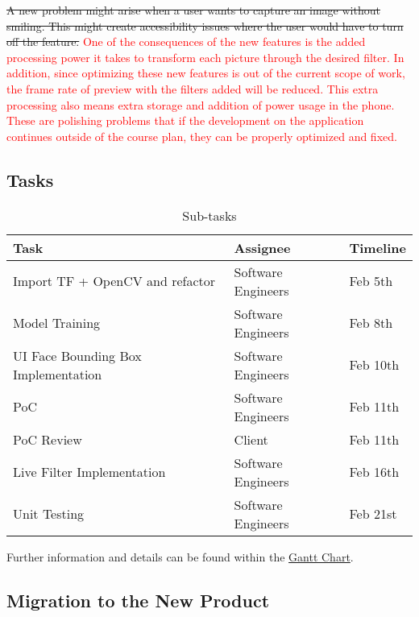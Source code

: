\documentclass[12pt, titlepage]{article}
\begin{document}
\sout{A new problem might arise when a user wants to capture an image without smiling. This might create accessibility issues where the user would have to turn off the feature.} \textcolor{red}{One of the consequences of the new features is the added processing power it takes to transform each picture through the desired filter.  In addition, since optimizing these new features is out of the current scope of work, the frame rate of preview with the filters added will be reduced. This extra processing also means extra storage and addition of power usage in the phone. These are polishing problems that if the development on the application continues outside of the course plan, they can be properly optimized and fixed.  }

\subsection{Tasks}


\begin{table}[h!]
\begin{center}
\begin{tabular}{|l|l|l|}
\hline
Task & Assignee & Timeline  \\\hline
Import TF + OpenCV and refactor & Software Engineers &   Feb 5th  \\\hline
Model Training  &  Software Engineers  &  Feb 8th   \\\hline
UI Face Bounding Box Implementation  &  Software Engineers  &  Feb 10th   \\\hline
PoC  &  Software Engineers  &  Feb 11th   \\\hline
PoC Review  &  Client  &  Feb 11th   \\\hline
Live Filter Implementation  &  Software Engineers  &   Feb 16th  \\\hline
Unit Testing  &  Software Engineers  &   Feb 21st  \\\hline
\end{tabular}
\caption{\label{tab:table-name}Sub-tasks}
\end{center}
\end{table}

Further information and details can be found within the \href{https://gitlab.cas.mcmaster.ca/yazdinip/opencamerarefined/-/blob/master/ProjectSchedule/Gantt.pdf}{Gantt Chart}.

\subsection{Migration to the New Product}
\end{document}
